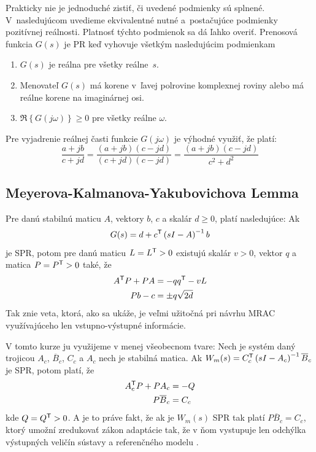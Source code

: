 ﻿\documentclass[a4paper, 10pt, ]{article}
\begin{document}
Prakticky nie je jednoduché zistiť, či uvedené podmienky sú splnené. V~nasledujúcom uvedieme ekvivalentné nutné a~postačujúce podmienky pozitívnej reálnosti. Platnosť týchto podmienok sa dá ľahko overiť.
Prenosová funkcia $G(s)$ je PR keď vyhovuje všetkým nasledujúcim podmienkam
\begin{enumerate}
	\item $G(s)$ je reálna pre všetky reálne~$s$.
	\item Menovateľ $G(s)$ má korene  v~ľavej polrovine komplexnej roviny alebo má reálne korene na imaginárnej osi.
	\item $\Re \left\{ G(j\omega) \right\} \geq 0$ pre všetky reálne $\omega$.
\end{enumerate}

\noindent
Pre vyjadrenie reálnej časti funkcie $G(j\omega)$ je výhodné využiť, že platí:
\begin{equation*}
	\frac{a + jb}{c + jd} = \frac{(a + jb) (c - jd)}{(c + jd) (c - jd)} = \frac{(a + jb) (c - jd)}{c^2 + d^2}
\end{equation*}





\subsection{Meyerova-Kalmanova-Yakubovichova Lemma}
\label{Meyer-Kalman-Yakubovichova Lemma}


Pre danú stabilnú maticu $A$, vektory $b$, $c$ a skalár $d \geq 0$, platí nasledujúce: Ak
\begin{equation*}
	G(s) = d + c^{\mathsf{T}} \left( s I - A \right)^{-1} b
\end{equation*}
je SPR, potom pre danú maticu $L = L^{\mathsf{T}} > 0$ existujú skalár $v > 0$, vektor $q$ a matica $P =P^{\mathsf{T}} > 0$ také, že
\begin{align*}
	A^{\mathsf{T}} P + P A &= - q q^{\mathsf{T}} - v L \\
	P b	- c	&= \pm q \sqrt{2d}
\end{align*}
Tak znie veta, ktorá, ako sa ukáže, je veľmi užitočná pri návrhu MRAC využívajúceho len vstupno-výstupné informácie.

V tomto kurze ju využijeme v menej všeobecnom tvare: Nech je systém daný trojicou $A_c$, $\overline{B}_c$, $C_c$ a $A_c$ nech je stabilná matica. Ak $ W_m(s) = C_c^{\mathsf{T}} \left(  s I - A_c \right)^{-1} \overline{B}_c $ je SPR, potom platí, že
\begin{align*}
	  A_c^{\mathsf{T}} P + P A_c &= - Q\\
	  P \overline{B}_c &= C_c
\end{align*}
kde $Q = Q^{\mathsf{T}} > 0$. A je to práve fakt, že ak je $W_m(s)$ SPR tak platí $P \overline{B}_c = C_c$, ktorý umožní zredukovať zákon adaptácie tak, že v ňom vystupuje len odchýlka výstupných veličín sústavy a referenčného modelu \cite{Mon74}.
\end{document}
